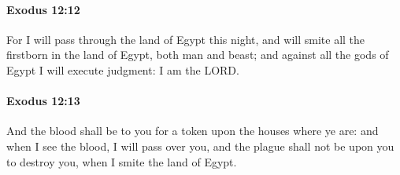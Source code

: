 		\paragraph{Exodus 12:12} %
			\label{EXODUS-12-12}

			For I will pass through the land of Egypt this night, and will smite all the firstborn in the land of Egypt, both man and beast; and against all the gods of Egypt I will execute judgment: I am the LORD.


		\paragraph{Exodus 12:13} %
			\label{EXODUS-12-13}

			And the blood shall be to you for a token upon the houses where ye are: and when I see the blood, I will pass over you, and the plague shall not be upon you to destroy you, when I smite the land of Egypt.

